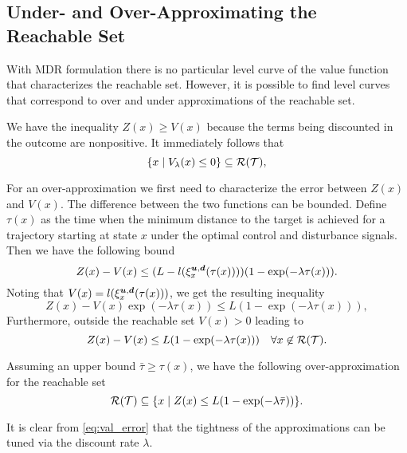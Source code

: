 \subsection{Under- and Over-Approximating the Reachable Set}
With MDR formulation there is no particular level curve of the value function that characterizes the reachable set. However, it is possible to find level curves that correspond to over and under approximations of the reachable set. 

We have the inequality $Z(x) \geq V(x)$ because the terms being discounted in the outcome are nonpositive. It immediately follows that
%
\begin{equation} \label{eq:reach_set}
\{x \mid V_{\lambda}(x) \le 0\} \subseteq \mathcal{R}(\mathcal{T}) ,
\end{equation}  

For an over-approximation we first need to characterize the error between $Z(x)$ and $V(x)$. The difference between the two functions can be bounded. Define $\tau(x)$ as the time when the minimum distance to the target is achieved for a trajectory starting at state $x$ under the optimal control and disturbance signals. Then we have the following bound
%
\begin{equation}
Z(x) - V(x)  \leq (L - l(\xi_{x}^{\bm{u},\bm{d}}(\tau(x))))( 1 -  \exp(-\lambda \tau(x)))
.
\end{equation}%
\noindent Noting that $V(x)=l(\xi_{x}^{\bm{u},\bm{d}}(\tau(x)))$, we get the resulting inequality
%
\begin{equation} \label{eq:val_error}
Z(x) -  V(x) \exp(-\lambda \tau(x)) \leq L( 1 -  \exp(-\lambda \tau(x))) ,
\end{equation}%
\noindent Furthermore, outside the reachable set $V(x)>0$ leading to
%
\begin{equation}
Z(x) -  V(x)  \leq L( 1 -  \exp(-\lambda \tau(x))) \quad \forall x \not\in \mathcal{R}(\mathcal{T}) .
\end{equation}

Assuming an upper bound  ${\bar{\tau} \geq \tau(x)}$, we have the following over-approximation for the reachable set
%
\begin{equation} \label{eq:reach_set}
\mathcal{R}(\mathcal{T}) \subseteq  \{x \mid Z(x) \le L( 1 -  \exp(-\lambda \bar{\tau})) \} .
\end{equation} 

It is clear from \eqref{eq:val_error} that the tightness of the approximations can be tuned via the discount rate $\lambda$.

